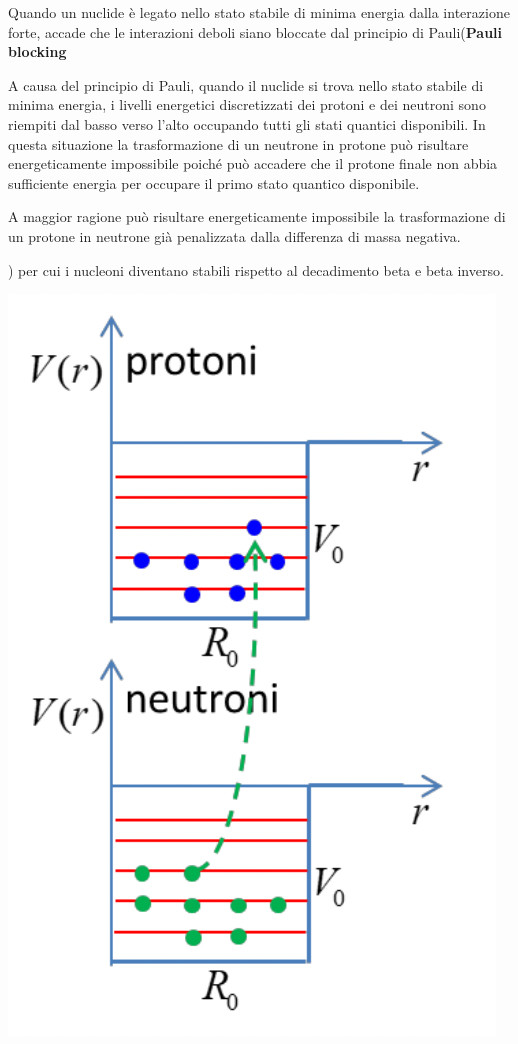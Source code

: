 Quando un nuclide è legato nello stato stabile di minima energia dalla interazione forte, accade che le interazioni
deboli siano bloccate dal principio di Pauli(\textbf{Pauli blocking}\sidenote
{
\label{siden:pauli-blocking}
A causa del principio di Pauli, quando il nuclide si trova nello stato stabile di minima energia, i livelli 
energetici discretizzati dei protoni e dei neutroni sono riempiti dal basso verso l’alto occupando tutti gli stati 
quantici disponibili.
In questa situazione la trasformazione di un neutrone in protone può risultare energeticamente impossibile poiché può 
accadere che il protone finale non abbia sufficiente energia per occupare il primo stato quantico disponibile. 

A maggior ragione può risultare energeticamente impossibile la trasformazione di un protone in neutrone già penalizzata
dalla differenza di massa negativa.}\label{sn:pauli-blocking}) per cui i nucleoni diventano stabili rispetto al
decadimento beta e beta inverso.
\begin{marginfigure}
    \centering
    \includegraphics{figs/pauli-blocking}
    \label{fig:pauli-blocking}
\end{marginfigure}

